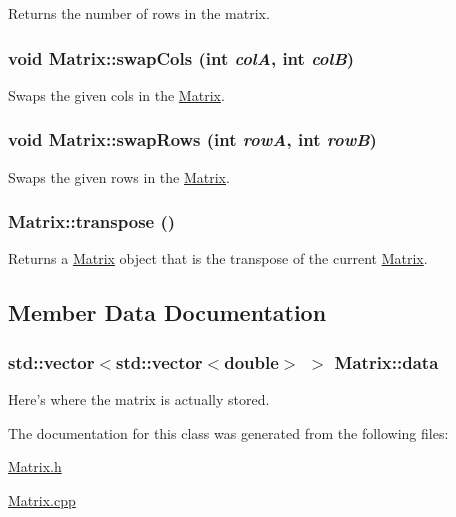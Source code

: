Returns the number of rows in the matrix. 

\hypertarget{class_matrix_a505f924baa7c236280751499da56ecee}{
\subsubsection[{swapCols}]{\setlength{\rightskip}{0pt plus 5cm}void Matrix::swapCols (int {\em colA}, \/  int {\em colB})}}
\label{class_matrix_a505f924baa7c236280751499da56ecee}


Swaps the given cols in the \hyperlink{class_matrix}{Matrix}. 

\hypertarget{class_matrix_ac0e73d5e98817e12b82a3f626c8343de}{
\subsubsection[{swapRows}]{\setlength{\rightskip}{0pt plus 5cm}void Matrix::swapRows (int {\em rowA}, \/  int {\em rowB})}}
\label{class_matrix_ac0e73d5e98817e12b82a3f626c8343de}


Swaps the given rows in the \hyperlink{class_matrix}{Matrix}. 

\hypertarget{class_matrix_ae23f817021383e3c8636a714dcba1d21}{
\subsubsection[{transpose}]{ Matrix::transpose ()}}
\label{class_matrix_ae23f817021383e3c8636a714dcba1d21}


Returns a \hyperlink{class_matrix}{Matrix} object that is the transpose of the current \hyperlink{class_matrix}{Matrix}. 



\subsection{Member Data Documentation}
\hypertarget{class_matrix_adab4557133e13b08ae470a8e5df7b99c}{
\subsubsection[{data}]{\setlength{\rightskip}{0pt plus 5cm}std::vector$<$std::vector$<$double$>$ $>$ {\bf Matrix::data}}}
\label{class_matrix_adab4557133e13b08ae470a8e5df7b99c}


Here's where the matrix is actually stored. 



The documentation for this class was generated from the following files:\begin{DoxyCompactItemize}
\item 
\hyperlink{_matrix_8h}{Matrix.h}\item 
\hyperlink{_matrix_8cpp}{Matrix.cpp}\end{DoxyCompactItemize}
